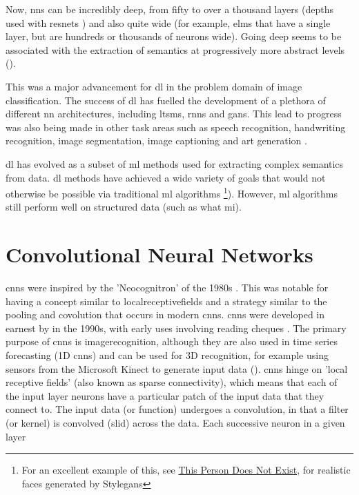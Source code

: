 Now, \gls{nn}s can be incredibly deep, from fifty to over a thousand layers (depths used with \gls{resnet}s \cite{resnet}) and also quite wide (for example, \gls{elm}s that have a single layer, but are hundreds or thousands of neurons wide). Going deep seems to be associated with the extraction of semantics at progressively more abstract levels (\cite{cnn_semantic}). 
\bigskip

This was a major advancement for \gls{dl} in the problem domain of image classification. The success of \gls{dl} has fuelled the development of a plethora of different \gls{nn} architectures, including \gls{ltsm}s, \gls{rnn}s and \gls{gan}s. This lead to progress was also being made in other task areas such as speech recognition, handwriting recognition, image segmentation, image captioning and art generation \cite{dl_overview}. 
\bigskip %
 
\gls{dl} has evolved as a subset of \gls{ml} methods used for extracting complex semantics from data. \gls{dl} methods have achieved a wide variety of goals that would not otherwise be possible via traditional \gls{ml} algorithms \footnote{For an excellent example of this, see \href{https://www.thispersondoesnotexist.com/}{This Person Does Not Exist}, for realistic faces generated by Style\gls{gan}s}). However, \gls{ml} algorithms still perform well on structured data (such as what mi).   
\bigskip

\bigskip %

\section{Convolutional Neural Networks}

\gls{cnn}s were inspired by the 'Neocognitron' of the 1980s \cite{neocognitron_proposal} \cite{neocognitron}. This was notable for having a concept similar to \gls{localreceptivefields} and a strategy similar to the pooling and covolution that occurs in modern \gls{cnn}s. \gls{cnn}s were developed in earnest by in the 1990s, with early uses involving reading cheques \cite{LeNet}. The primary purpose of \gls{cnn}s is \gls{imagerecognition}, although they are also used in time series forecasting (1D \gls{cnn}s) and can be used for 3D recognition, for example using sensors from the Microsoft Kinect to generate input data (\cite{3d_conv}). \gls{cnn}s hinge on 'local receptive fields' (also known as sparse connectivity), which means that each of the input layer neurons have a particular patch of the input data that they connect to. The input data (or function) undergoes a convolution, in that a filter (or kernel) is convolved (slid) across the data. Each successive \gls{neuron} in a given layer \cite[Chapter~5]{good_fellow_2016}

